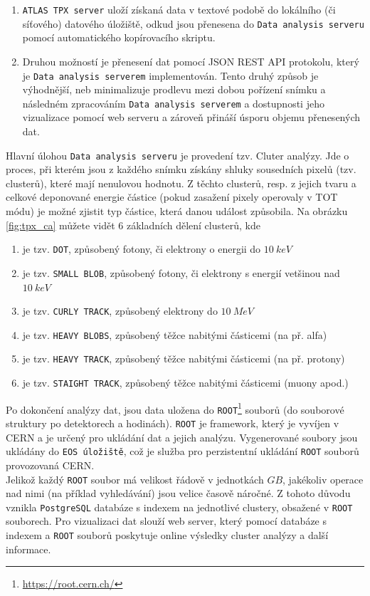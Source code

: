 \begin{description}
		\begin{enumerate}
			\item \texttt{ATLAS TPX server} uloží získaná data v textové podobě do lokálního (či síťového) datového úložiště, odkud jsou přenesena do \texttt{Data analysis serveru} pomocí automatického kopírovacího skriptu.
			\item Druhou možností je přenesení dat pomocí JSON REST API protokolu, který je \texttt{Data analysis serverem} implementován. Tento druhý způsob je výhodnější, neb minimalizuje prodlevu mezi dobou pořízení snímku a následném zpracováním \texttt{Data analysis serverem} a dostupnosti jeho vizualizace pomocí web serveru a zároveň přináší úsporu objemu přenesených dat.
		\end{enumerate}
		Hlavní úlohou \texttt{Data analysis serveru} je provedení tzv. Cluter analýzy. Jde o proces, při kterém jsou z každého snímku získány shluky sousedních pixelů (tzv. clusterů), které mají nenulovou hodnotu. Z těchto clusterů, resp. z jejich tvaru a celkové deponované energie částice (pokud zasažení pixely operovaly v TOT módu) je možné zjistit typ částice, která danou událost způsobila. Na obrázku \ref{fig:tpx_ca} můžete vidět 6 základních dělení clusterů, kde
		 \begin{enumerate}[label=(\alph*)]
			\item je tzv. \texttt{DOT}, způsobený fotony, či elektrony o energii do $10~keV$
			\item je tzv. \texttt{SMALL BLOB}, způsobený fotony, či elektrony s energií vetšinou nad $10~keV$
			\item je tzv. \texttt{CURLY TRACK}, způsobený elektrony do $10~MeV$
			\item je tzv. \texttt{HEAVY BLOBS}, způsobený těžce nabitými částicemi (na př. alfa)
			\item je tzv. \texttt{HEAVY TRACK}, způsobený těžce nabitými částicemi (na př. protony)
			\item je tzv. \texttt{STAIGHT TRACK}, způsobený těžce nabitými částicemi (muony apod.)
		\end{enumerate}
		Po dokončení analýzy dat, jsou data uložena do \texttt{ROOT}\footnote{\url{https://root.cern.ch/}} souborů (do souborové struktury po detektorech a hodinách). \texttt{ROOT} je framework, který je vyvíjen v CERN a je určený pro ukládání dat a jejich analýzu. Vygenerované soubory jsou ukládány do \texttt{EOS úložiště}, což je služba pro perzistentní ukládání \texttt{ROOT} souborů provozovaná CERN.\\
		Jelikož každý \texttt{ROOT} soubor má velikost řádově v jednotkách $GB$, jakékoliv operace nad nimi (na příklad vyhledávání) jsou velice časově náročné. Z tohoto důvodu vznikla \texttt{PostgreSQL} databáze s indexem na jednotlivé clustery, obsažené v \texttt{ROOT} souborech. 
		Pro vizualizaci dat slouží web server, který pomocí databáze s indexem a \texttt{ROOT} souborů poskytuje online výsledky cluster analýzy a další informace.
\end{description}

